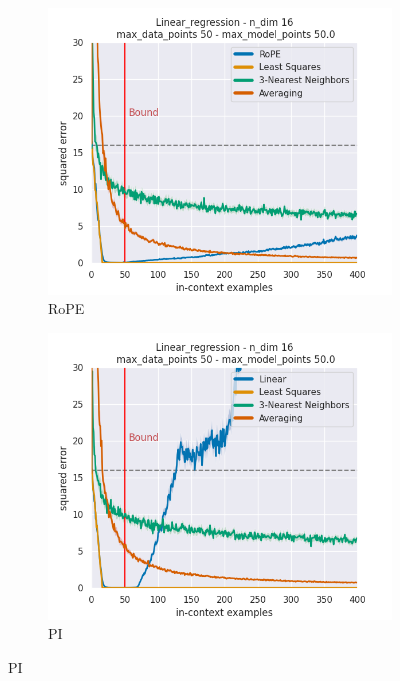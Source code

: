 \documentclass[letterpaper]{article} %
\begin{document}
\begin{figure}[tp]
    \centering
    \begin{subfigure}[t]{0.32\linewidth}
        \includegraphics[width=\linewidth]{AnonymousSubmission/LaTeX/imgs/appendix/linear-regression/rope.png}
        \caption{RoPE}
    \end{subfigure}
    \begin{subfigure}[t]{0.32\linewidth}
        \includegraphics[width=\linewidth]{AnonymousSubmission/LaTeX/imgs/appendix/linear-regression/linear.png}
        \caption{PI}

\end{subfigure}
\end{figure}
\end{document}
